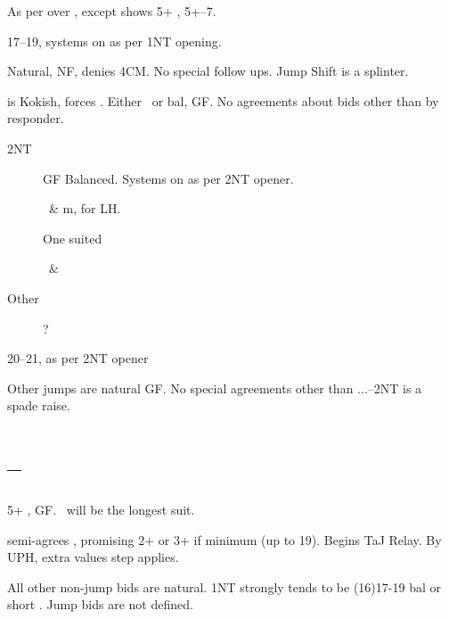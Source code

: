 \documentclass[tom-ari]{subfile}
\begin{document}
	\begin{boxbid}{}
		As per over , except  shows 5+ \heartsuit, 5+--7.
	\end{boxbid}
	
	\begin{boxbid}{}
		17--19, systems on as per 1NT opening.
	\end{boxbid}

	\begin{boxbid}{}
		Natural, NF, denies 4CM.  No special follow ups. Jump Shift is a splinter.
	\end{boxbid}

	\begin{boxbid}{}
		 is Kokish, forces .  Either \heartsuit ~or bal, GF.  No agreements about bids other than  by responder.
		\begin{description}
		\item[2NT] GF Balanced.  Systems on as per 2NT opener.
		\item[] \heartsuit ~\& m,  for LH.
		\item[] One suited \heartsuit
		\item[] \heartsuit ~\& \spadesuit
		\item[Other] ?
		\end{description} 
	\end{boxbid}

	\begin{boxbid}{}
		20--21, as per 2NT opener
	\end{boxbid}

	\begin{boxbid}{}
		Other jumps are natural GF.  No special agreements other than ...--2NT is a spade raise.
	\end{boxbid}


	\section[1C--1H]{--}
	
	5+ \spadesuit, GF.  \spadesuit ~will be the longest suit.
	
	 semi-agrees \spadesuit, promising 2+ or 3+ if minimum (up to 19).  Begins TaJ Relay.  By UPH, extra values step applies.
	
	All other non-jump bids are natural.  1NT strongly tends to be (16)17-19 bal or short \spadesuit.  Jump bids are not defined.
	
\end{document}
